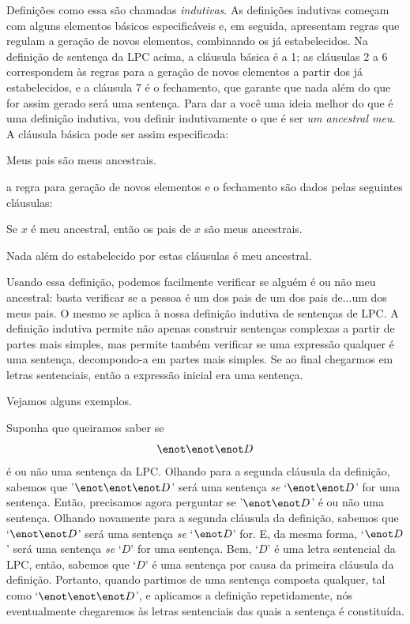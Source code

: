 Definições como essa são chamadas \emph{indutivas}.
As definições indutivas começam com alguns elementos básicos especificáveis e, em seguida, apresentam regras que regulam a geração de novos elementos, combinando os já estabelecidos.
Na definição de sentença da LPC acima, a cláusula básica é a 1; as cláusulas 2 a 6 correspondem às regras para a geração de novos elementos a partir dos já estabelecidos, e a cláusula 7 é o fechamento, que garante que nada além do que for assim gerado será uma sentença.
Para dar a você uma ideia melhor do que é uma definição indutiva, vou definir indutivamente o que é ser \emph{um ancestral meu}.
A cláusula básica pode ser assim especificada:
	\begin{ebullet}
		\item Meus pais são meus ancestrais.
	\end{ebullet}
a regra para geração de novos elementos e o fechamento são dados pelas seguintes cláusulas:
	\begin{ebullet}
		\item Se $x$ é meu ancestral, então os pais de $x$ são meus ancestrais.
		\item Nada além do estabelecido por estas cláusulas é meu ancestral.
	\end{ebullet}
Usando essa definição, podemos facilmente verificar se alguém é ou não meu ancestral:
basta verificar se a pessoa é um dos pais de um dos pais de...um dos meus pais.
O mesmo se aplica à nossa definição indutiva de sentenças de LPC.
A definição indutiva permite não apenas construir sentenças complexas a partir de partes mais simples, mas permite também verificar se uma expressão qualquer é uma sentença, decompondo-a em partes mais simples. Se ao final chegarmos em letras sentenciais, então a expressão inicial era uma sentença.

Vejamos alguns exemplos.

Suponha que queiramos saber se
$$\enot\enot\enot D$$
é ou não uma sentença da LPC.
Olhando para a segunda cláusula da definição, sabemos que '$\enot\enot\enot D$' será uma sentença \emph{se} `$\enot\enot D$' for uma sentença.
Então, precisamos agora perguntar se '$\enot\enot D$' é ou não uma sentença.
Olhando novamente para a segunda cláusula da definição, sabemos que `$\enot\enot D$' será uma sentença \emph{se} `$\enot D$' for.
E, da mesma forma, `$\enot D$' será uma sentença \emph{se} `$D$' for uma sentença.
Bem, `$D$' é uma letra sentencial da LPC, então, sabemos que `$D$' é uma sentença por causa da primeira cláusula da definição.
Portanto, quando partimos de uma sentença composta qualquer, tal como `$\enot\enot\enot D$', e aplicamos a definição repetidamente, nós eventualmente chegaremos às letras sentenciais das quais a sentença é constituída.

